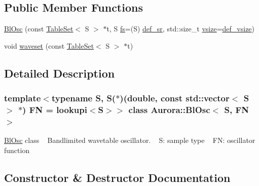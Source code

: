 \subsection*{Public Member Functions}
\begin{DoxyCompactItemize}
\item 
\hyperlink{class_aurora_1_1_bl_osc_a70a21ed3ae7e69c236b9af7e64911920}{Bl\+Osc} (const \hyperlink{class_aurora_1_1_table_set}{Table\+Set}$<$ S $>$ $\ast$t, S \hyperlink{class_aurora_1_1_osc_a10d968f92bf489112dd990c15cda6780}{fs}=(S) \hyperlink{namespace_aurora_ad49263d809bea98dd422e95bc91bc03e}{def\+\_\+sr}, std\+::size\+\_\+t \hyperlink{class_aurora_1_1_snd_base_af9e21aaf411b17f7a8221c991ce5d291}{vsize}=\hyperlink{namespace_aurora_afaaddf667a06e7ce23c667a8b7295263}{def\+\_\+vsize})
\item 
void \hyperlink{class_aurora_1_1_bl_osc_a053c6740b4b419c6c03e246188906ebc}{waveset} (const \hyperlink{class_aurora_1_1_table_set}{Table\+Set}$<$ S $>$ $\ast$t)
\end{DoxyCompactItemize}


\subsection{Detailed Description}
\subsubsection*{template$<$typename S, S($\ast$)(double, const std\+::vector$<$ S $>$ $\ast$) FN = lookupi$<$\+S$>$$>$\newline
class Aurora\+::\+Bl\+Osc$<$ S, F\+N $>$}

\hyperlink{class_aurora_1_1_bl_osc}{Bl\+Osc} class ~\newline
Bandlimited wavetable oscillator. ~\newline
S\+: sample type ~\newline
FN\+: oscillator function 

\subsection{Constructor \& Destructor Documentation}
\mbox{\label{class_aurora_1_1_bl_osc_a70a21ed3ae7e69c236b9af7e64911920}} 
